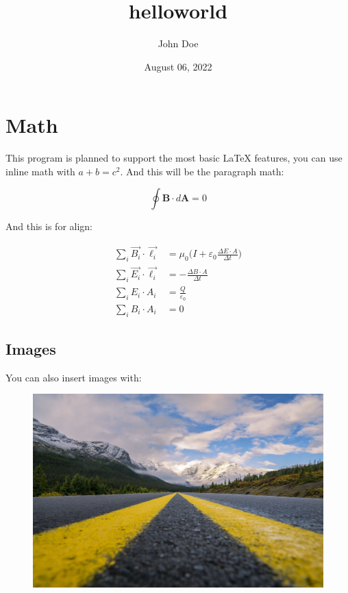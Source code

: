 \documentclass[12pt]{article}
\title{helloworld}
\author{John Doe}
\date{August 06, 2022}
\begin{document}
    \section{Math}

    This program is planned to support the most basic LaTeX features, you can use inline math with $a + b = c^2$. And this will be the paragraph math:

    \begin{equation}
        \oint \boldsymbol{B} \cdot d \boldsymbol{A} = 0
    \end{equation}

    And this is for align:

    \begin{align}
        \sum_{i} \vec{B_{i}} \cdot \vec{\ell_{i}} &= \mu_{0} \bigg(I + \varepsilon_{0} \frac{\Delta E \cdot A}{\Delta t} \bigg) \\
        \sum_{i} \vec{E_{i}} \cdot \vec{\ell_{i}} &= - \frac{\Delta B \cdot A}{\Delta t} \\
        \sum_{i} E_{i} \cdot A_{i} &= \frac{Q}{\varepsilon_{0}} \\
        \sum_{i} B_{i} \cdot A_{i} &= 0
    \end{align}

    \subsection{Images}

    You can also insert images with:

    \begin{figure}[h]
        \includegraphics[width=\textwidth]{./sample_image.jpeg}
    \end{figure}
\end{document}
